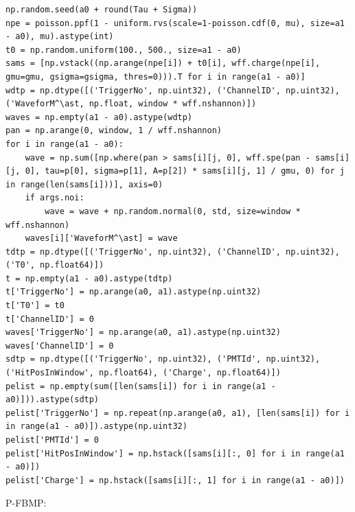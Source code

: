 \documentclass[notitlepage]{article}
\begin{document}
\begin{lstlisting}
np.random.seed(a0 + round(Tau + Sigma))
npe = poisson.ppf(1 - uniform.rvs(scale=1-poisson.cdf(0, mu), size=a1 - a0), mu).astype(int)
t0 = np.random.uniform(100., 500., size=a1 - a0)
sams = [np.vstack((np.arange(npe[i]) + t0[i], wff.charge(npe[i], gmu=gmu, gsigma=gsigma, thres=0))).T for i in range(a1 - a0)]
wdtp = np.dtype([('TriggerNo', np.uint32), ('ChannelID', np.uint32), ('WaveforM^\ast, np.float, window * wff.nshannon)])
waves = np.empty(a1 - a0).astype(wdtp)
pan = np.arange(0, window, 1 / wff.nshannon)
for i in range(a1 - a0):
    wave = np.sum([np.where(pan > sams[i][j, 0], wff.spe(pan - sams[i][j, 0], tau=p[0], sigma=p[1], A=p[2]) * sams[i][j, 1] / gmu, 0) for j in range(len(sams[i]))], axis=0)
    if args.noi:
        wave = wave + np.random.normal(0, std, size=window * wff.nshannon)
    waves[i]['WaveforM^\ast] = wave
tdtp = np.dtype([('TriggerNo', np.uint32), ('ChannelID', np.uint32), ('T0', np.float64)])
t = np.empty(a1 - a0).astype(tdtp)
t['TriggerNo'] = np.arange(a0, a1).astype(np.uint32)
t['T0'] = t0
t['ChannelID'] = 0
waves['TriggerNo'] = np.arange(a0, a1).astype(np.uint32)
waves['ChannelID'] = 0
sdtp = np.dtype([('TriggerNo', np.uint32), ('PMTId', np.uint32), ('HitPosInWindow', np.float64), ('Charge', np.float64)])
pelist = np.empty(sum([len(sams[i]) for i in range(a1 - a0)])).astype(sdtp)
pelist['TriggerNo'] = np.repeat(np.arange(a0, a1), [len(sams[i]) for i in range(a1 - a0)]).astype(np.uint32)
pelist['PMTId'] = 0
pelist['HitPosInWindow'] = np.hstack([sams[i][:, 0] for i in range(a1 - a0)])
pelist['Charge'] = np.hstack([sams[i][:, 1] for i in range(a1 - a0)])
\end{lstlisting}

P-FBMP:
\end{document}
